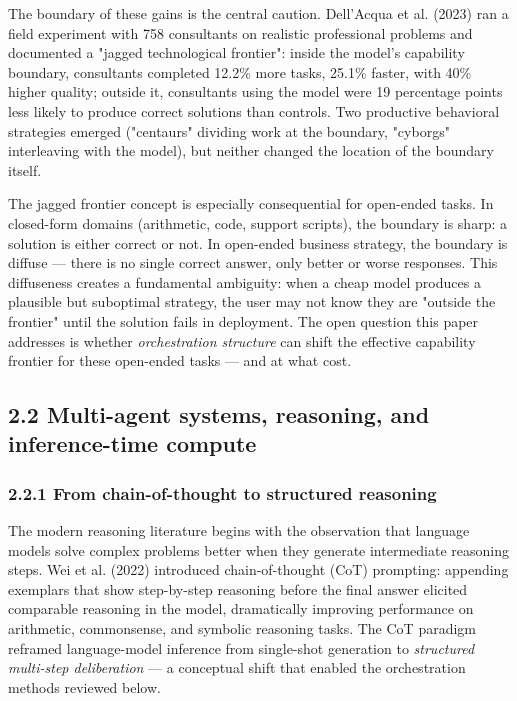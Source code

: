 \documentclass[11pt,a4paper]{article}
\begin{document}
The boundary of these gains is the central caution. Dell'Acqua et al.
(2023) ran a field experiment with 758 consultants on realistic professional
problems and documented a "jagged technological frontier": inside the model's
capability boundary, consultants completed 12.2\% more tasks, 25.1\% faster,
with 40\% higher quality; outside it, consultants using the model were 19
percentage points less likely to produce correct solutions than controls.
Two productive behavioral strategies emerged ("centaurs" dividing work at
the boundary, "cyborgs" interleaving with the model), but neither changed
the location of the boundary itself.

The jagged frontier concept is especially consequential for open-ended tasks.
In closed-form domains (arithmetic, code, support scripts), the boundary is
sharp: a solution is either correct or not. In open-ended business strategy,
the boundary is diffuse — there is no single correct answer, only better or
worse responses. This diffuseness creates a fundamental ambiguity: when a
cheap model produces a plausible but suboptimal strategy, the user may not
know they are "outside the frontier" until the solution fails in deployment.
The open question this paper addresses is whether \textit{orchestration structure}
can shift the effective capability frontier for these open-ended tasks —
and at what cost.

\subsection{2.2 Multi-agent systems, reasoning, and inference-time compute}

\subsubsection{2.2.1 From chain-of-thought to structured reasoning}

The modern reasoning literature begins with the observation that language
models solve complex problems better when they generate intermediate
reasoning steps. Wei et al. (2022) introduced chain-of-thought (CoT)
prompting: appending exemplars that show step-by-step reasoning before the
final answer elicited comparable reasoning in the model, dramatically
improving performance on arithmetic, commonsense, and symbolic reasoning
tasks. The CoT paradigm reframed language-model inference from
single-shot generation to \textit{structured multi-step deliberation} — a
conceptual shift that enabled the orchestration methods reviewed below.
\end{document}
